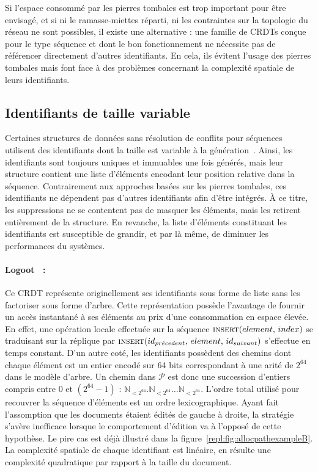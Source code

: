 Si l'espace consommé par les pierres tombales est trop important pour être
envisagé, et si ni le ramasse-miettes réparti, ni les contraintes sur la
topologie du réseau ne sont possibles, il existe une alternative : une famille
de CRDTs conçue pour le type séquence et dont le bon fonctionnement ne nécessite
pas de référencer directement d'autres identifiants. En cela, ils évitent
l'usage des pierres tombales mais font face à des problèmes concernant la
complexité spatiale de leurs identifiants.

\subsection{Identifiants de taille variable}

Certaines structures de données sans résolution de conflits pour séquences
utilisent des identifiants dont la taille est variable à la
génération~\cite{andre2013supporting, preguica2009commutative,
  weiss2009logoot}. Ainsi, les identifiants sont toujours uniques et immuables
une fois générés, mais leur structure contient une liste d'éléments encodant
leur position relative dans la séquence.  Contrairement aux approches basées sur
les pierres tombales, ces identifiants ne dépendent pas d'autres identifiants
afin d'être intégrés. À ce titre, les suppressions ne se contentent pas de
masquer les éléments, mais les retirent entièrement de la structure. En
revanche, la liste d'éléments constituant les identifiants est susceptible de
grandir, et par là même, de diminuer les performances du systèmes.

\paragraph{Logoot~\cite{weiss2010collaborative, weiss2009logoot,
    weiss2010logootundo} :} Ce CRDT représente originellement ses identifiants
sous forme de liste sans les factoriser sous forme d'arbre. Cette représentation
possède l'avantage de fournir un accès instantané à ses éléments au prix d'une
consommation en espace élevée. En effet, une opération locale effectuée sur la
séquence $\textsc{insert}(element,\, index)$ se traduisant sur la réplique par
$\textsc{insert}(id_{pr\acute{e}cedent},\, element,\, id_{suivant})$ s'effectue
en temps constant. D'un autre coté, les identifiants possèdent des chemins dont
chaque élément est un entier encodé sur 64 bits correspondant à une arité de
$2^{64}$ dans le modèle d'arbre. Un chemin dans $\mathcal{P}$ est donc une
succession d'entiers compris entre 0 et $(2^{64}-1)$ :
$\mathbb{N}_{<2^{64}}.\mathbb{N}_{<2^{64}}\ldots\mathbb{N}_{<2^{64}}$.  L'ordre
total utilisé pour recouvrer la séquence d'éléments est un ordre
lexicographique. Ayant fait l'assomption que les documents étaient édités de
gauche à droite, la stratégie s'avère inefficace lorsque le comportement
d'édition va à l'opposé de cette hypothèse. Le pire cas est déjà illustré dans
la figure~\ref{repl:fig:allocpathexampleB}. La complexité spatiale de chaque
identifiant est linéaire, en résulte une complexité quadratique par rapport à la
taille du document.

